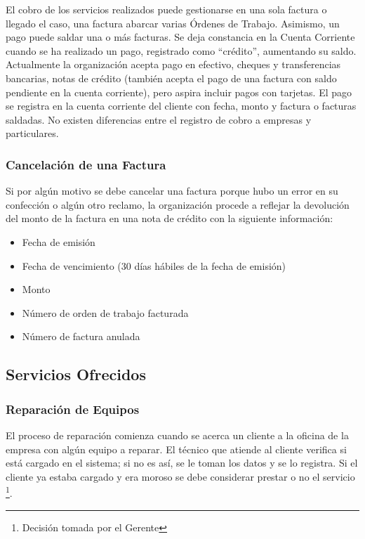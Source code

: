 \documentclass[12pt]{extarticle}
\begin{document}
\begin{spacing}{1.2}
    El cobro de los servicios realizados puede gestionarse en una sola factura o llegado el caso, una factura abarcar varias Órdenes de Trabajo. Asimismo, un pago puede saldar una o más facturas. Se deja constancia en la Cuenta Corriente cuando se ha realizado un pago, registrado como ``crédito'', aumentando su saldo. Actualmente la organización acepta pago en efectivo, cheques y transferencias bancarias, notas de crédito (también acepta el pago de una factura con saldo pendiente en la cuenta corriente), pero aspira incluir pagos con tarjetas. El pago se registra en la cuenta corriente del cliente con fecha, monto y factura o facturas saldadas. No existen diferencias entre el registro de cobro a empresas y particulares.\\

    \subsubsection*{Cancelación de una Factura}
    Si por algún motivo se debe cancelar una factura porque hubo un error en su confección o algún otro reclamo, la organización procede a reflejar la devolución del monto de la factura en una nota de crédito con la siguiente información: \\
    \begin{itemize}
        \item Fecha de emisión
        \item Fecha de vencimiento (30 días hábiles de la fecha de emisión)
        \item Monto
        \item Número de orden de trabajo facturada
        \item Número de factura anulada
    \end{itemize}

    \pagebreak
    \subsection{Servicios Ofrecidos}

    \subsubsection{Reparación de Equipos}
    El proceso de reparación comienza cuando se acerca un cliente a la oficina de la empresa con algún equipo a reparar. El técnico que atiende al cliente verifica si está cargado en el sistema; si no es así, se le toman los datos y se lo registra. Si el cliente ya estaba cargado y era moroso se debe considerar prestar o no el servicio \footnote{Decisión tomada por el Gerente}.
    

\end{spacing}
\end{document}
